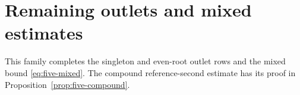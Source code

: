 




























\section{Remaining outlets and mixed estimates}\label{app:five-remaining-outlets}
This family completes the singleton and even-root outlet rows and the mixed bound \eqref{eq:five-mixed}. The compound reference-second estimate has its proof in Proposition~\ref{prop:five-compound}.









